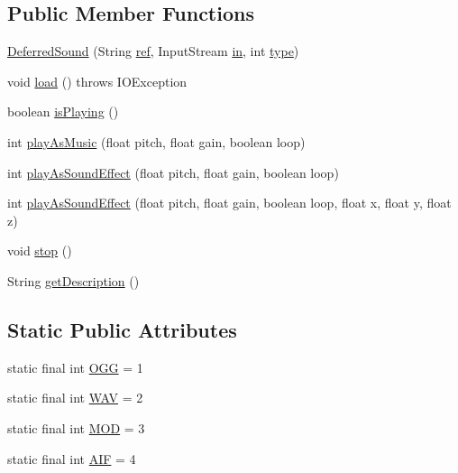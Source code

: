 \subsection*{Public Member Functions}
\begin{DoxyCompactItemize}
\item 
\mbox{\hyperlink{classorg_1_1newdawn_1_1slick_1_1openal_1_1_deferred_sound_a8861b7f487cf1d467a062106b9045fbb}{Deferred\+Sound}} (String \mbox{\hyperlink{classorg_1_1newdawn_1_1slick_1_1openal_1_1_deferred_sound_adfed2acfb0cb1ef789edfc3102fa682c}{ref}}, Input\+Stream \mbox{\hyperlink{classorg_1_1newdawn_1_1slick_1_1openal_1_1_deferred_sound_a3abbd7ab8edc3ba6fc29e0a62388b898}{in}}, int \mbox{\hyperlink{classorg_1_1newdawn_1_1slick_1_1openal_1_1_deferred_sound_aaebd240dac7c3e4dba3a81fe174a9028}{type}})
\item 
void \mbox{\hyperlink{classorg_1_1newdawn_1_1slick_1_1openal_1_1_deferred_sound_a4f7e7f24c22aa787cc38ef670c4e4dc8}{load}} ()  throws I\+O\+Exception 
\item 
boolean \mbox{\hyperlink{classorg_1_1newdawn_1_1slick_1_1openal_1_1_deferred_sound_a165c465a5d0e1092cf2a6c1a0cf77e96}{is\+Playing}} ()
\item 
int \mbox{\hyperlink{classorg_1_1newdawn_1_1slick_1_1openal_1_1_deferred_sound_a45f8b32fe216cc2430b16a10f1104aab}{play\+As\+Music}} (float pitch, float gain, boolean loop)
\item 
int \mbox{\hyperlink{classorg_1_1newdawn_1_1slick_1_1openal_1_1_deferred_sound_a190d70bc5dc152dbc8ca60a2842d02ee}{play\+As\+Sound\+Effect}} (float pitch, float gain, boolean loop)
\item 
int \mbox{\hyperlink{classorg_1_1newdawn_1_1slick_1_1openal_1_1_deferred_sound_ae3a58c7d18fdd5d5444351631977eb8f}{play\+As\+Sound\+Effect}} (float pitch, float gain, boolean loop, float x, float y, float z)
\item 
void \mbox{\hyperlink{classorg_1_1newdawn_1_1slick_1_1openal_1_1_deferred_sound_af5e0e80f3944f1cb3bba586f67b94337}{stop}} ()
\item 
String \mbox{\hyperlink{classorg_1_1newdawn_1_1slick_1_1openal_1_1_deferred_sound_ade00f475d697e1a4152be52b478210cc}{get\+Description}} ()
\end{DoxyCompactItemize}
\subsection*{Static Public Attributes}
\begin{DoxyCompactItemize}
\item 
static final int \mbox{\hyperlink{classorg_1_1newdawn_1_1slick_1_1openal_1_1_deferred_sound_a8c51f8e7ef170801332ccd24b4162c34}{O\+GG}} = 1
\item 
static final int \mbox{\hyperlink{classorg_1_1newdawn_1_1slick_1_1openal_1_1_deferred_sound_af83a9e7ce95e92c243d48878d0576e6e}{W\+AV}} = 2
\item 
static final int \mbox{\hyperlink{classorg_1_1newdawn_1_1slick_1_1openal_1_1_deferred_sound_aeaaf7badbe884f825415140f16141fe4}{M\+OD}} = 3
\item 
static final int \mbox{\hyperlink{classorg_1_1newdawn_1_1slick_1_1openal_1_1_deferred_sound_abf62a0f4062961ae7a52af61455ba0ed}{A\+IF}} = 4
\end{DoxyCompactItemize}
